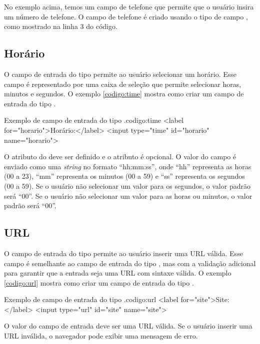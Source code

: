 No exemplo acima, temos um campo de telefone que permite que o usuário insira um número de telefone. O campo de telefone é criado usando o tipo de campo , como mostrado na linha 3 do código.

\subsection{Horário}

O campo de entrada do tipo  permite ao usuário selecionar um horário. Esse campo é representado por uma caixa de seleção que permite selecionar horas, minutos e segundos. O exemplo \ref{codigo:time} mostra como criar um campo de entrada do tipo .

\begin{htmlcode}{Exemplo de campo de entrada do tipo .}{codigo:time}
<label for="horario">Horário:</label>
<input type="time" id="horario" name="horario">
\end{htmlcode}

O atributo  do  deve ser definido e o atributo  é opcional. O valor do campo é enviado como uma \textit{string} no formato ``hh:mm:ss'', onde ``hh'' representa as horas (00 a 23), ``mm'' representa os minutos (00 a 59) e ``ss'' representa os segundos (00 a 59). Se o usuário não selecionar um valor para os segundos, o valor padrão será ``00''. Se o usuário não selecionar um valor para as horas ou minutos, o valor padrão será ``00''.

\subsection{URL}

O campo de entrada do tipo  permite ao usuário inserir uma URL válida. Esse campo é semelhante ao campo de entrada do tipo , mas com a validação adicional para garantir que a entrada seja uma URL com sintaxe válida. O exemplo \ref{codigo:url} mostra como criar um campo de entrada do tipo .

\begin{htmlcode}{Exemplo de campo de entrada do tipo .}{codigo:url}
<label for="site">Site:</label>
<input type="url" id="site" name="site">
\end{htmlcode}

O valor do campo de entrada deve ser uma URL válida. Se o usuário inserir uma URL inválida, o navegador pode exibir uma mensagem de erro.

